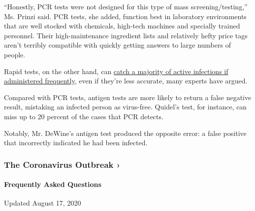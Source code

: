 ``Honestly, PCR tests were not designed for this type of mass
screening/testing,'' Ms. Prinzi said. PCR tests, she added, function
best in laboratory environments that are well stocked with chemicals,
high-tech machines and specially trained personnel. Their
high-maintenance ingredient lists and relatively hefty price tags aren't
terribly compatible with quickly getting answers to large numbers of
people.

Rapid tests, on the other hand, can
\href{https://www.nytimes3xbfgragh.onion/2020/08/06/health/rapid-Covid-tests.html}{catch
a majority of active infections if administered frequently}, even if
they're less accurate, many experts have argued.

Compared with PCR tests, antigen tests are more likely to return a false
negative result, mistaking an infected person as virus-free. Quidel's
test, for instance, can miss up to 20 percent of the cases that PCR
detects.

Notably, Mr. DeWine's antigen test produced the opposite error: a false
positive that incorrectly indicated he had been infected.

\href{https://www.nytimes3xbfgragh.onion/news-event/coronavirus?action=click\&pgtype=Article\&state=default\&region=MAIN_CONTENT_3\&context=storylines_faq}{}

\hypertarget{the-coronavirus-outbreak-}{%
\subsubsection{The Coronavirus Outbreak
›}\label{the-coronavirus-outbreak-}}

\hypertarget{frequently-asked-questions}{%
\paragraph{Frequently Asked
Questions}\label{frequently-asked-questions}}

Updated August 17, 2020

